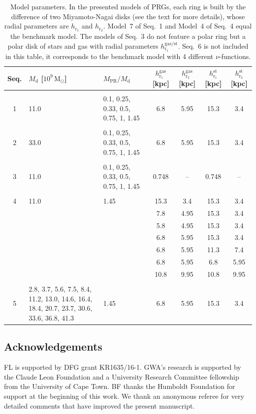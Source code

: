 \documentclass[useAMS,usenatbib]{mn2e}
\newcommand{\Msun}{\ensuremath{\text{M}_\odot}}
\begin{document}
\begin{table}
\begin{tabularx}{\textwidth}{cZZcccc}
	\hline
	Seq. &
	$M_\text{d}$ [$10^9\,\Msun$] &
	$M_\text{PR}/M_\text{d}$&
	$h_{\text{r}_1}^\text{gas}$ [kpc]  &
	$h_{\text{r}_2}^\text{gas}$ [kpc] &
	$h_{\text{r}_1}^\text{st}$ [kpc]  &
	$h_{\text{r}_2}^\text{st}$ [kpc] 
	\\
	\hline
	\\
	1	&	11.0	&	0.1, 0.25, 0.33, 0.5, 0.75, 1, 1.45  &  6.8	&  5.95	&  15.3	&  3.4 \\
	\\
	2	&	33.0	&	0.1, 0.25, 0.33, 0.5, 0.75, 1, 1.45  &  6.8	&  5.95	&  15.3	&  3.4 \\
	\\
	3	&	11.0	&	0.1, 0.25, 0.33, 0.5, 0.75, 1, 1.45  &  0.748	& -- 	&  0.748 & --  \\
	\\
	4	&	11.0	&	1.45 &  15.3	&  3.4  	&  15.3	&  3.4	\\
		&	&	&	7.8	&  4.95	&  15.3	&  3.4	\\
		&	&	&  5.8	&  4.95	&  15.3	&  3.4	\\
		&	&	&  6.8	&  5.95	&  15.3	&  3.4 \\
		&	&	&  6.8	&  5.95	&  11.3	&  7.4	\\
		&	&	&  6.8	&  5.95	&  6.8	&  5.95	\\
		&	&	&  10.8	&  9.95	&  10.8	&  9.95	\\
	\\
	5	& 2.8, 3.7, 5.6, 7.5, 8.4, 11.2, 13.0, 14.6, 16.4, 18.4, 20.7, 23.7, 30.6, 33.6, 36.8, 41.3  &  1.45 &  6.8		&  5.95	&  15.3	&  3.4 \\
	\hline
\end{tabularx}
\label{tab:ringsizes}
\caption{Model parameters. In the presented models of PRGs, each ring is built by the difference of two Miyamoto-Nagai disks (see the text for more details), whose radial parameters are $h_{\text{r}_1}$ and $h_{\text{r}_2}$. Model~7 of Seq.~1 and Model~4 of Seq.~4 equal the benchmark model. The models of Seq.~3 do not feature a polar ring but a polar disk of stars and gas with radial parameters $h_{\text{r}_1}^\text{gas/st}$. Seq.~6 is not included in this table, it corresponds to the benchmark model with 4 different $\nu$-functions.}
\end{table}

\subsection*{Acknowledgements}
FL is supported by DFG grant \mbox{KR1635/16-1}. GWA's research is supported by the Claude Leon Foundation and a University Research Committee fellowship from the University of Cape Town. BF thanks the Humboldt Foundation for support at the beginning of this work. We thank an anonymous referee for very detailed comments that have improved the present manuscript.
\end{document}

